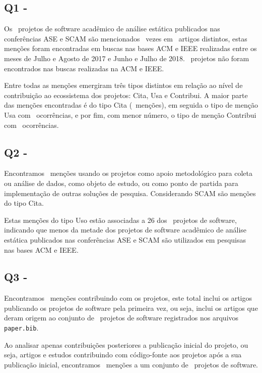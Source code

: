 \subsection{Q1 - \EstudoDoisQuestaoUm}

Os \SoftwareCount \ projetos de software acadêmico de análise estática
publicados nas conferências ASE e SCAM são mencionados \ScreeningCount \ vezes
em \ScreeningUniqueCount \ artigos distintos, estas menções foram encontradas
em buscas nas bases ACM e IEEE realizadas entre os meses de Julho e Agosto de
2017 e Junho e Julho de 2018. \SoftwareNotFoundOnSearch \ projetos não foram encontrados nas buscas
realizadas na ACM e IEEE.

Entre todas as menções emergiram três tipos distintos em relação ao nível de
contribuição ao ecossistema dos projetos: Cita, Usa e Contribui. A maior parte
das menções encontradas é do tipo Cita (\CiteCount \ menções), em seguida
o tipo de menção Usa com \UseCount \ ocorrências, e por fim, com menor número,
o tipo de menção Contribui com \ContributeCount \ ocorrências.

\subsection{Q2 - \EstudoDoisQuestaoDois}

Encontramos \UseCount \ menções usando os projetos como apoio metodológico para
coleta ou análise de dados, como objeto de estudo, ou como ponto de partida
para implementação de outras soluções de pesquisa. Considerando SCAM são \UseSCAMCount menções do tipo Cita.

Estas menções do tipo Uso estão associadas a 26 dos \SoftwareCount \ projetos
de software, indicando que menos da metade dos projetos de software acadêmico
de análise estática publicados nas conferências ASE e SCAM são utilizados em
pesquisas nas bases ACM e IEEE.

\subsection{Q3 - \EstudoDoisQuestaoTres}

Encontramos \ContributeCount \ menções contribuindo com os projetos, este total
inclui os artigos publicando os projetos de software pela primeira vez, ou
seja, inclui os artigos que deram origem ao conjunto de \SoftwareCount \
projetos de software registrados nos arquivos \texttt{paper.bib}.

Ao analisar apenas contribuições posteriores a publicação inicial
do projeto, ou seja, artigos e estudos contribuindo com código-fonte
aos projetos após a sua publicação inicial, encontramos
\ContributeStudyDoisCount \ menções a um conjunto de
\ContributeStudyDoisSoftware \ projetos de software.

